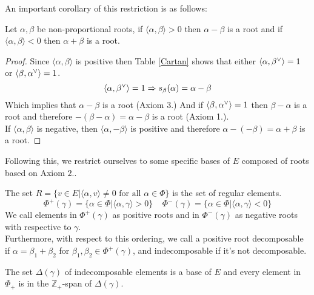 An important corollary of this restriction is as follows:
\begin{corol}
	Let $\alpha,\beta$ be non-proportional roots, if $\langle \alpha,\beta \rangle > 0$ then $\alpha-\beta$ is a root and if $\langle \alpha,\beta \rangle <0$ then $\alpha+\beta$ is a root.
	\label{corolcartan}
\end{corol}
\begin{proof}
	Since $\langle \alpha, \beta \rangle$ is positive then Table \ref{Cartan} shows that either $\langle {\alpha},{\beta}^\lor\rangle=1$ or $\langle {\beta},{\alpha}^\lor\rangle=1$.\\
	$$\langle {\alpha},{\beta}^\lor\rangle=1 \Rightarrow s_\beta(\alpha) = \alpha - \beta$$
	Which implies that $\alpha-\beta$ is a root (Axiom 3.)
	And if $\langle {\beta},{\alpha}^\lor\rangle=1$ then $\beta-\alpha$ is a root and therefore $-(\beta-\alpha)=\alpha-\beta$ is a root (Axiom 1.).\\
	If $\langle \alpha,\beta \rangle$ is negative, then $\langle \alpha,-\beta \rangle $ is positive and therefore $\alpha-(-\beta) = \alpha+\beta$ is a root.
\end{proof}
Following this, we restrict ourselves to some specific bases of $E$ composed of roots based on Axiom $2.$.
\begin{defi}
	The set $R=\{v \in E| \langle \alpha,v \rangle \not=0 \text{ for all } \alpha \in \Phi\}$ is the set of regular elements.\\
	$$\Phi^+(\gamma) = \{\alpha \in \Phi | \langle\alpha, \gamma\rangle>0 \}\ \ \ \ \ \Phi^-(\gamma) = \{\alpha \in \Phi|\langle \alpha,\gamma \rangle < 0\}$$
	We call elements in $\Phi^+(\gamma)$ as positive roots and in $\Phi^-(\gamma)$ as negative roots with respective to $\gamma$.\\
	Furthermore, with respect to this ordering, we call a positive root decomposable if $\alpha=\beta_1+\beta_2$ for $\beta_1,\beta_2 \in \Phi^+(\gamma)$, and indecomposable if it's not decomposable.
\end{defi}
\begin{teo}
	The set $\Delta(\gamma)$ of indecomposable elements is a base of $E$ and every element in $\Phi_+$ is in the $\mathbb{Z}_+$-span of $\Delta(\gamma)$.
	\label{basetheo}
\end{teo}
